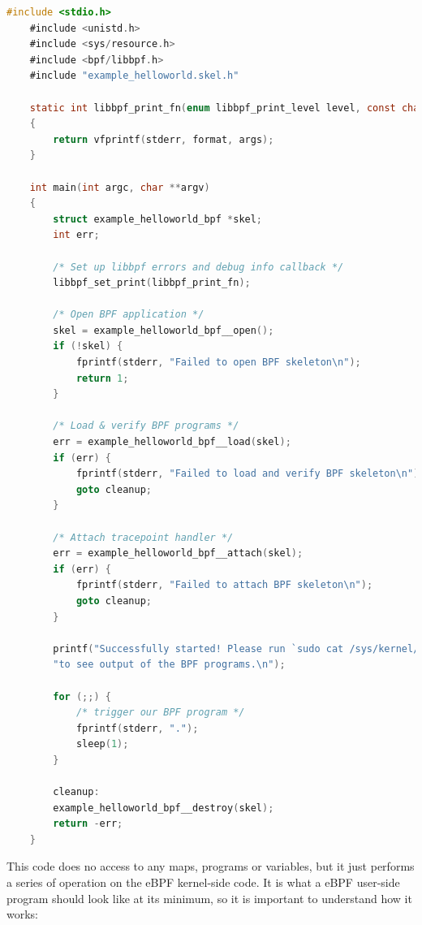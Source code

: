 \begin{lstlisting}[language=C, caption={``Hello world!'' user side program using libbpf-bootstrap}, title=example\_helloworld.c]
	#include <stdio.h>
	#include <unistd.h>
	#include <sys/resource.h>
	#include <bpf/libbpf.h>
	#include "example_helloworld.skel.h"
	
	static int libbpf_print_fn(enum libbpf_print_level level, const char *format, va_list args)
	{
		return vfprintf(stderr, format, args);
	}
	
	int main(int argc, char **argv)
	{
		struct example_helloworld_bpf *skel;
		int err;
		
		/* Set up libbpf errors and debug info callback */
		libbpf_set_print(libbpf_print_fn);
		
		/* Open BPF application */
		skel = example_helloworld_bpf__open();
		if (!skel) {
			fprintf(stderr, "Failed to open BPF skeleton\n");
			return 1;
		}   
		
		/* Load & verify BPF programs */
		err = example_helloworld_bpf__load(skel);
		if (err) {
			fprintf(stderr, "Failed to load and verify BPF skeleton\n");
			goto cleanup;
		}
		
		/* Attach tracepoint handler */
		err = example_helloworld_bpf__attach(skel);
		if (err) {
			fprintf(stderr, "Failed to attach BPF skeleton\n");
			goto cleanup;
		}
		
		printf("Successfully started! Please run `sudo cat /sys/kernel/debug/tracing/trace_pipe` "
		"to see output of the BPF programs.\n");
		
		for (;;) {
			/* trigger our BPF program */
			fprintf(stderr, ".");
			sleep(1);
		}
		
		cleanup:
		example_helloworld_bpf__destroy(skel);
		return -err;
	}
\end{lstlisting}

This code does no access to any maps, programs or variables, but it just performs a series of operation on the eBPF kernel-side code.
It is what a eBPF user-side program should look like at its minimum, so it is important to understand how it works:

